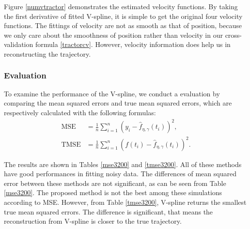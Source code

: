 Figure \ref{numvtractor} demonstrates the estimated velocity functions. By taking the first derivative of fitted V-spline, it is simple to get the original four velocity functions. The fittings of velocity are not as smooth as that of position, because we only care about the smoothness of position rather than velocity in our cross-validation formula \eqref{tractorcv}. However, velocity information does help us in reconstructing the trajectory.



\subsubsection{Evaluation}

To examine the performance of the V-spline, we conduct a evaluation by comparing the mean squared errors and true mean squared errors, which are respectively calculated with the following formulas: 
\begin{align}
\mbox{MSE}&= \frac{1}{n} \sum_{i=1}^{n} \left( y_i-\hat{f}_{\eta,\gamma}(t_i) \right)^2,\\
\mbox{TMSE}&= \frac{1}{n} \sum_{i=1}^{n} \left( f(t_i)-\hat{f}_{\eta,\gamma}(t_i) \right)^2.
\end{align}


The results are shown in Tables \ref{mse3200} and \ref{tmse3200}. All of these methods have good performances in fitting noisy data. The differences of mean squared error between these methods are not significant, as can be seen from Table \ref{mse3200}. The proposed method is not the best among these simulations according to MSE. However, from Table \ref{tmse3200}, V-spline returns the smallest true mean squared errors. The difference is significant, that means the reconstruction from V-spline is closer to the true trajectory. 
 
